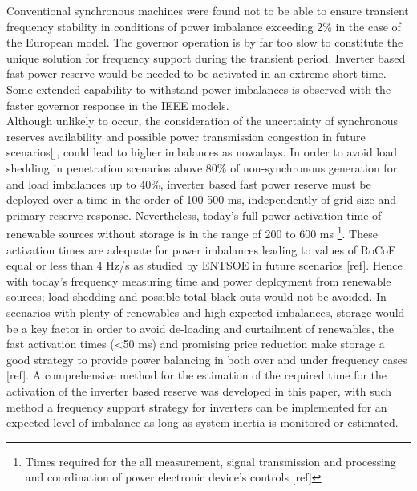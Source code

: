 Conventional synchronous machines were found not to be able to ensure transient frequency stability in conditions of power imbalance exceeding 2\% in the case of the European model. The governor operation is by far too slow to constitute the unique solution for frequency support during the transient period. Inverter based fast power reserve would be needed to be activated in an extreme short time. Some extended capability to withstand power imbalances is observed with the faster governor response in the IEEE models. \\

Although unlikely to occur, the consideration of the uncertainty of synchronous reserves availability and possible power transmission congestion in future scenarios[], could lead to higher imbalances as nowadays. In order to avoid load shedding in penetration scenarios above 80\% of non-synchronous generation for and load imbalances up to 40\%, inverter based fast power reserve must be deployed over a time in the order of 100-500 ms, independently of grid size and primary reserve response. Nevertheless, today’s full power activation time of renewable sources without storage is in the range of 200 to 600 ms \footnote{Times required for the all measurement, signal transmission and processing and coordination of power electronic device's controls [ref]}. These activation times are adequate for power imbalances leading to values of RoCoF equal or less than 4 Hz/s as studied by ENTSOE in future scenarios [ref]. Hence with today’s frequency measuring time and power deployment from renewable sources; load shedding and possible total black outs would not be avoided. In scenarios with plenty of renewables and high expected imbalances, storage would be a key factor in order to avoid de-loading and curtailment of renewables, the fast activation times (<50 ms) and promising price reduction make storage a good strategy to provide power balancing in both over and under frequency cases [ref]. A comprehensive method for the estimation of the required time for the activation of the inverter based reserve was developed in this paper, with such method a frequency support strategy for inverters can be implemented for an expected level of imbalance as long as system inertia is monitored or estimated.\\


